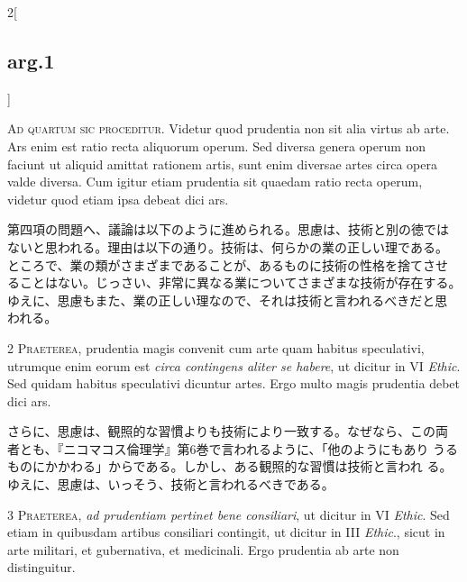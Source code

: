 \documentclass[paper=a4paper,fontsize=10pt,jafontsize=9pt,titlepage]{jlreq}
\begin{document}
\begin{paracol}{2}[\subsection{arg.1}]

{\huge A}{\scshape d quartum sic proceditur}. Videtur quod prudentia
 non sit alia virtus ab arte. Ars enim est ratio recta aliquorum
 operum. Sed diversa genera operum non faciunt ut aliquid amittat
 rationem artis, sunt enim diversae artes circa opera valde
 diversa. Cum igitur etiam prudentia sit quaedam ratio recta operum,
 videtur quod etiam ipsa debeat dici ars.

\switchcolumn

第四項の問題へ、議論は以下のように進められる。思慮は、技術と別の徳では
ないと思われる。理由は以下の通り。技術は、何らかの業の正しい理である。
ところで、業の類がさまざまであることが、あるものに技術の性格を捨てさせ
ることはない。じっさい、非常に異なる業についてさまざまな技術が存在する。
ゆえに、思慮もまた、業の正しい理なので、それは技術と言われるべきだと思
われる。


{\scshape 2 Praeterea}, prudentia magis convenit cum arte quam habitus
speculativi, utrumque enim eorum est {\itshape circa contingens aliter
se habere}, ut dicitur in VI {\itshape Ethic}. Sed quidam habitus
speculativi dicuntur artes. Ergo multo magis prudentia debet dici ars.

\switchcolumn

さらに、思慮は、観照的な習慣よりも技術により一致する。なぜなら、この両
者とも、『ニコマコス倫理学』第6巻で言われるように、「他のようにもあり
うるものにかかわる」からである。しかし、ある観照的な習慣は技術と言われ
る。ゆえに、思慮は、いっそう、技術と言われるべきである。


{\scshape 3 Praeterea}, {\itshape ad prudentiam pertinet bene
consiliari}, ut dicitur in VI {\itshape Ethic}. Sed etiam in quibusdam
artibus consiliari contingit, ut dicitur in III {\itshape Ethic}.,
sicut in arte militari, et gubernativa, et medicinali. Ergo prudentia
ab arte non distinguitur.


\end{paracol}
\end{document}
